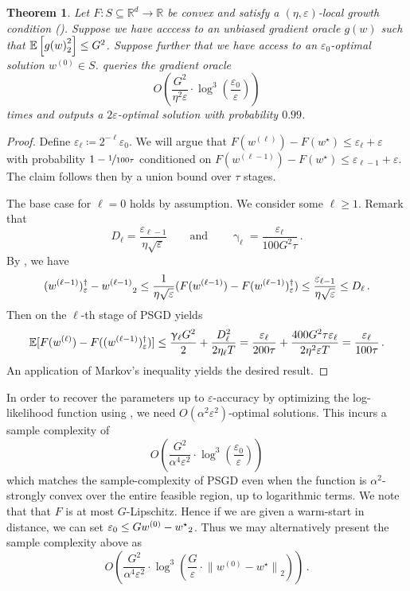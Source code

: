 \documentclass[11pt,letterpaper]{article}
\newcommand{\sset}{\subseteq}
\theoremstyle{plain}
\newtheorem{theorem}{Theorem}[section]
\theoremstyle{definition}
\theoremstyle{remark}
\newcommand{\qquadtext}[1]{\qquad\text{#1}\qquad}
\newcommand{\qquadand}{\qquadtext{and}}
\newcommand{\inparen}[1]{\ensuremath{\left(#1\right)}}
\newcommand{\insquare}[1]{\ensuremath{\left[#1\right]}}
\newcommand{\snorm}[1]{\ensuremath{\ensuremath{\| #1 \|}}}
\let\norm\relax
\newcommand{\norm}[1]{\ensuremath{\left\lVert #1 \right\rVert}}
\newcommand{\R}{\mathbb{R}}
\newcommand{\E}{\operatornamewithlimits{\mathbb{E}}}
\newcommand{\nfrac}[2]{\nicefrac{#1}{#2}}
\newcommand{\eps}{\varepsilon}
\renewcommand{\gamma}{\upgamma}
\begin{document}
{{{\begin{theorem}\label{thm:SGD-local-growth-convergence}
    Let $F\colon S\sset \R^d\to \R$ be convex and satisfy a $(\eta, \eps)$-local growth condition ().
    Suppose we have acccess to an unbiased gradient oracle $g(w)$ such that $\E\insquare{\norm{g(w)}_2^2}\leq G^2$.
    Suppose further that we have access to an $\eps_0$-optimal solution $w^{(0)}\in S$.
     queries the gradient oracle
    \[
        O\inparen{\frac{G^2}{\eta^2 \eps} \cdot \log^3\inparen{\frac{\eps_0}{\eps}}}
    \]
    times and outputs a $2\eps$-optimal solution with probability $0.99$.
\end{theorem}

\begin{proof}
    Define $\eps_\ell \coloneqq 2^{-\ell} \eps_0$.
    We will argue that $F(w^{(\ell)}) - F(w^\star) \leq \eps_{\ell} + \eps$
    with probability $1-\nfrac1{100\tau}$ conditioned on $F(w^{(\ell-1)}) - F(w^\star) \leq \eps_{\ell-1} + \eps$.
    The claim follows then by a union bound over $\tau$ stages.

    The base case for $\ell=0$ holds by assumption.
    We consider some $\ell\geq 1$.
    Remark that
    \[
        D_\ell = \frac{\eps_{\ell-1}}{\eta \sqrt{\eps}}
        \qquadand
        \gamma_\ell = \frac{\eps_\ell}{100G^2\tau}\,.
    \]
    By ,
    we have
    \[
        \norm{(w^{(\ell-1)})_\eps^\dagger - w^{(\ell-1)}}_2
        \leq \frac{1}{\eta \sqrt\eps} (F(w^{(\ell-1)}) - F(w^{(\ell-1)})_\eps^\dagger)
        \leq \frac{\eps_{\ell-1}}{\eta\sqrt\eps}
        \leq D_\ell\,.
    \]
    Then  on the $\ell$-th stage of PSGD yields
    \[
        \E[F(w^{(\ell)}) - F((w^{(\ell-1)})_\eps^\dagger)]
        \leq \frac{\gamma_\ell G^2}{2} + \frac{D_\ell^2}{2\eta_\ell T}
        = \frac{\eps_\ell}{200\tau} + \frac{400G^2\tau \eps_\ell}{2\eta^2 \eps T}
        = \frac{\eps_\ell}{100\tau}\,.
    \]
    An application of Markov's inequality yields the desired result.
\end{proof}
In order to recover the parameters up to $\eps$-accuracy by optimizing the log-likelihood function using ,
we need $O(\alpha^2\eps^2)$-optimal solutions.
This incurs a sample complexity of
\[
    O\inparen{\frac{G^2}{\alpha^4 \eps^2} \cdot \log^3\inparen{\frac{\eps_0}{\eps}}}
\]
which matches the sample-complexity of PSGD even when the function is $\alpha^2$-strongly convex over the entire feasible region,
up to logarithmic terms.
We note that that $F$ is at most $G$-Lipschitz.
Hence if we are given a warm-start in distance,
we can set $\eps_0\leq G\norm{w^{(0)} - w^\star}_2$.
Thus we may alternatively present the sample complexity above as
\[
    O\inparen{\frac{G^2}{\alpha^4 \eps^2} \cdot \log^3\inparen{\frac{G}{\eps}\cdot \snorm{w^{(0)} - w^\star}_2}}\,.
\]

}}}
\end{document}
